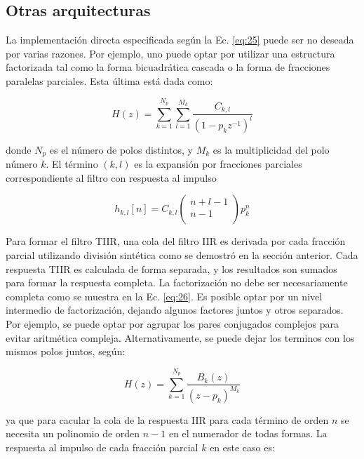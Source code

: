 \subsection{Otras arquitecturas}
    La implementación directa especificada según la Ec. \ref{eq:25} puede ser no deseada por varias razones. Por ejemplo, uno puede optar por utilizar una estructura factorizada tal como la forma bicuadrática cascada o la forma de fracciones paralelas parciales. Esta última está dada como:

    \begin{equation}
      H(z) = \sum_{k=1}^{N_p}{\sum_{l=1}^{M_k}{\frac{C_{k,l}}{(1-p_k z^{-1})^l}}}
      \label{eq:26}
    \end{equation}

    donde $N_p$ es el número de polos distintos, y $M_k$ es la multiplicidad del polo número $k$. El término $(k,l)$ es la expansión por fracciones parciales correspondiente al filtro con respuesta al impulso

    \begin{equation}
      h_{k,l}[n] = C_{k,l}
      \left(
      \begin{matrix}
               n + l - 1 \\
               n - 1 \\
      \end{matrix}
      \right)
           p_{k}^{n}
         \end{equation}

         Para formar el filtro TIIR, una cola del filtro IIR es derivada por cada fracción parcial utilizando división sintética como se demostró en la sección anterior. Cada respuesta TIIR es calculada de forma separada, y los resultados son sumados para formar la respuesta completa. La factorización no debe ser necesariamente completa como se muestra en la Ec. \ref{eq:26}. Es posible optar por un nivel intermedio de factorización, dejando algunos factores juntos y otros separados. Por ejemplo, se puede optar por agrupar los pares conjugados complejos para evitar aritmética compleja. Alternativamente, se puede dejar los terminos con los mismos polos juntos, según:

         \begin{equation}
           H(z) = \sum_{k=1}^{N_p}{\frac{B_k(z)}{(z-p_k)^{M_k}}}
         \end{equation}

         ya que para cacular la cola de la respuesta IIR para cada término de orden $n$ se necesita un polinomio de orden $n-1$ en el numerador de todas formas. La respuesta al impulso de  cada fracción parcial $k$ en este caso es:

